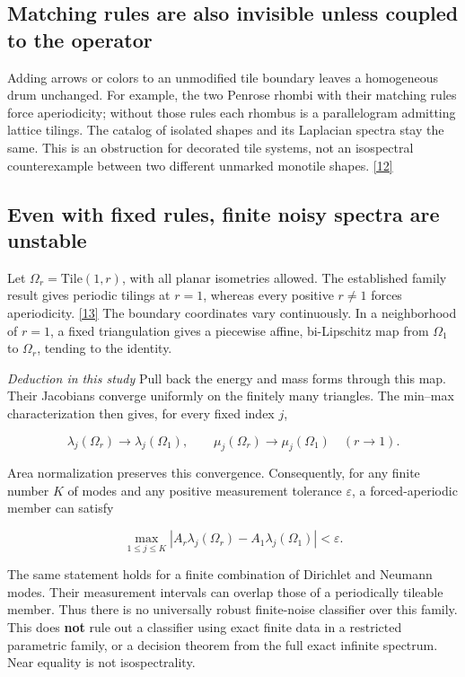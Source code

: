 \documentclass[11pt]{article}
\begin{document}
\subsection*{Matching rules are also invisible unless coupled to the operator}


Adding arrows or colors to an unmodified tile boundary leaves a homogeneous drum unchanged. For example, the two Penrose rhombi with their matching rules force aperiodicity; without those rules each rhombus is a parallelogram admitting lattice tilings. The catalog of isolated shapes and its Laplacian spectra stay the same. This is an obstruction for decorated tile systems, not an isospectral counterexample between two different unmarked monotile shapes. \hyperlink{ref12}{[12]}



\subsection*{Even with fixed rules, finite noisy spectra are unstable}


Let \(\Omega_r=\mathrm{Tile}(1,r)\), with all planar isometries allowed. The established family result gives periodic tilings at \(r=1\), whereas every positive \(r\ne1\) forces aperiodicity. \hyperlink{ref13}{[13]} The boundary coordinates vary continuously. In a neighborhood of \(r=1\), a fixed triangulation gives a piecewise affine, bi-Lipschitz map from \(\Omega_1\) to \(\Omega_r\), tending to the identity.



\textit{Deduction in this study} Pull back the energy and mass forms through this map. Their Jacobians converge uniformly on the finitely many triangles. The min--max characterization then gives, for every fixed index \(j\),


\[ \lambda_j(\Omega_r)\longrightarrow\lambda_j(\Omega_1),\qquad \mu_j(\Omega_r)\longrightarrow\mu_j(\Omega_1)\quad(r\to1). \]

Area normalization preserves this convergence. Consequently, for any finite number \(K\) of modes and any positive measurement tolerance \(\varepsilon\), a forced-aperiodic member can satisfy


\[ \max_{1\le j\le K}\left|A_r\lambda_j(\Omega_r)-A_1\lambda_j(\Omega_1)\right|<\varepsilon. \]

The same statement holds for a finite combination of Dirichlet and Neumann modes. Their measurement intervals can overlap those of a periodically tileable member. Thus there is no universally robust finite-noise classifier over this family. This does \textbf{not} rule out a classifier using exact finite data in a restricted parametric family, or a decision theorem from the full exact infinite spectrum. Near equality is not isospectrality.
\end{document}
